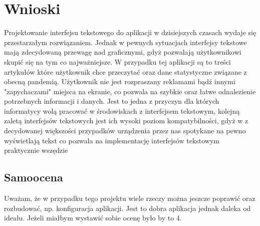 \documentclass{article}
\begin{document}
\section{Wnioski}

Projektowanie interfejsu tekstowego do aplikacji w dzisiejszych czasach wydaje się przestarzałym rozwiązaniem. Jednak w pewnych sytuacjach
interfejsy tekstowe mają zdecydowaną przewagę nad graficznymi, gdyż pozwalają użytkownikowi skupić się na tym co najważniejsze. W przypadku tej aplikacji
są to treści artykułów które użytkownik chce przeczytać oraz dane statystyczne związane z obecną pandemią. Użytkownik nie jest rozpraszany 
reklamami bądź innymi "zapychaczami" miejsca na ekranie, co pozwala na szybkie oraz łatwe odnalezienie potrzebnych informacji i danych. Jest to
jedna z przyczyn dla których informatycy wolą pracować w środowiskach z interfejsem tekstowym, kolejną zaletą interfejsów tekstowych jest ich wysoki poziom
kompatybilności, gdyż w z decydowanej większości przypadków urządzenia przez nas spotykane na pewno wyświetlają tekst co pozwala na implementację
interfejsów tekstowym praktycznie wszędzie

\subsection{Samoocena}
Uważam, że w przypadku tego projektu wiele rzeczy można jeszcze poprawić oraz rozbudować, np. konfiguracja aplikacji. Jest to dobra aplikacja jednak daleka od ideału. Jeżeli miałbym wystawić sobie ocenę
było by to 4.
\end{document}
